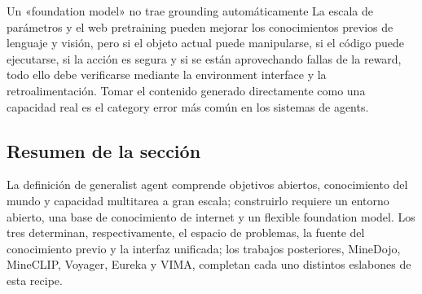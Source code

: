 \begin{warningbox}{Un «foundation model» no trae grounding automáticamente}
La escala de parámetros y el web pretraining pueden mejorar los conocimientos previos de lenguaje y visión, pero si el objeto actual puede manipularse, si el código puede ejecutarse, si la acción es segura y si se están aprovechando fallas de la reward, todo ello debe verificarse mediante la environment interface y la retroalimentación. Tomar el contenido generado directamente como una capacidad real es el category error más común en los sistemas de agents.
\end{warningbox}

\subsection{Resumen de la sección}

La definición de generalist agent comprende objetivos abiertos, conocimiento del mundo y capacidad multitarea a gran escala; construirlo requiere un entorno abierto, una base de conocimiento de internet y un flexible foundation model. Los tres determinan, respectivamente, el espacio de problemas, la fuente del conocimiento previo y la interfaz unificada; los trabajos posteriores, MineDojo, MineCLIP, Voyager, Eureka y VIMA, completan cada uno distintos eslabones de esta recipe.
